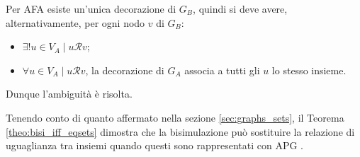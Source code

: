 \begin{proof2}
\begin{enumerate}
              Per AFA esiste un'unica decorazione di $G_B$, quindi si deve avere, alternativamente, per ogni nodo $v$ di $G_B$:
              \begin{itemize}
                  \item $\exists ! u \in V_A \mid u \mathcal{R} v$;
                  \item $\forall u \in V_A \mid u \mathcal{R} v$, la decorazione di $G_A$ associa a tutti gli $u$ lo stesso insieme.
              \end{itemize}
              Dunque l'ambiguità è risolta.
    \end{enumerate}
    \vspace*{-0.75cm}
\end{proof2}
Tenendo conto di quanto affermato nella sezione \ref{sec:graphs_sets}, il Teorema \ref{theo:bisi_iff_eqsets} dimostra che la bisimulazione può sostituire la relazione di uguaglianza tra insiemi quando questi sono rappresentati con APG \cite{dovier}.

